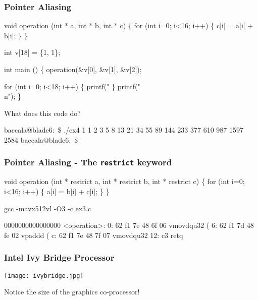 \documentclass{beamer}
\begin{document}
\begin{frame}[fragile]
\frametitle{Pointer Aliasing}
\begin{semiverbatim}
\tiny
void operation (int * a, int * b, int * c)
\{
  for (int i=0; i<16; i++) \{
    c[i] = a[i] + b[i];
  \}
\}
\end{semiverbatim}
\pause
\begin{semiverbatim}
\tiny
int v[18] = \{1, 1\};

int main () \{
  operation(\&v[0], \&v[1], \&v[2]);

  for (int i=0; i<18; i++) \{
    printf("%
  \}
  printf("\\n");
\}
\end{semiverbatim}
What does this code do?
\pause
\begin{semiverbatim}
\tiny
baccala@blade6:~\$ ./ex4
1 1 2 3 5 8 13 21 34 55 89 144 233 377 610 987 1597 2584 
baccala@blade6:~\$
\end{semiverbatim}
\end{frame}


\begin{frame}[fragile]
\frametitle{Pointer Aliasing - The {\tt restrict} keyword}
\begin{semiverbatim}
\tiny
void operation (int * restrict a, int * restrict b, int * restrict c)
\{
  for (int i=0; i<16; i++) \{
    a[i] = b[i] + c[i];
  \}
\}


gcc -mavx512vl -O3 -c ex3.c

0000000000000000 <operation>:
   0:   62 f1 7e 48 6f 06       vmovdqu32 (%
   6:   62 f1 7d 48 fe 02       vpaddd (%
   c:   62 f1 7e 48 7f 07       vmovdqu32 %
  12:   c3                      retq   

\end{semiverbatim}
\end{frame}

\begin{frame}
\frametitle{Intel Ivy Bridge Processor}
\texttt{[image: ivybridge.jpg]}
\begin{center}
\huge
Notice the size of the graphics co-processor!
\end{center}
\end{frame}
\end{document}
